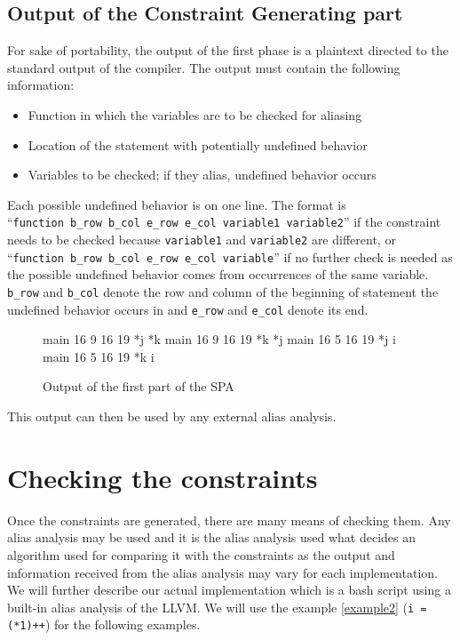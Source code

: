 
\subsection{Output of the Constraint Generating part}
For sake of portability, the output of the first phase is a plaintext directed to the standard output of the compiler. The output must contain the following information:

\begin{itemize}
\item Function in which the variables are to be checked for aliasing
\item Location of the statement with potentially undefined behavior
\item Variables to be checked; if they alias, undefined behavior occurs
\end{itemize}

Each possible undefined behavior is on one line. The format is
\\``\verb|function b_row b_col e_row e_col variable1 variable2|''
if the constraint needs to be checked because \verb|variable1| and \verb|variable2| are different, or
\\``\verb|function b_row b_col e_row e_col variable|''
if no further check is needed as the possible undefined behavior comes from occurrences of the same variable. \verb|b_row| and \verb|b_col| denote the row and column of the beginning of statement the undefined behavior occurs in and \verb|e_row| and \verb|e_col| denote its end.

\begin{figure}
\caption{Output of the first part of the SPA}
\label{first-part-output}
\begin{code}
main 16 9 16 19 *j *k
main 16 9 16 19 *k *j
main 16 5 16 19 *j i
main 16 5 16 19 *k i
\end{code}
\end{figure}

This output can then be used by any external alias analysis.

\section{Checking the constraints}
Once the constraints are generated, there are many means of checking them. Any alias analysis may be used and it is the alias analysis used what decides an algorithm used for comparing it with the constraints as the output and information received from the alias analysis may vary for each implementation. We will further describe our actual implementation which is a bash script using a built-in alias analysis of the LLVM. We will use the example \ref{example2} (\verb|i = (*1)++|) for the following examples.

